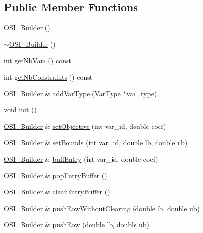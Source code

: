 \subsection*{Public Member Functions}
\begin{DoxyCompactItemize}
\item 
\hyperlink{class_o_s_i___builder_ab1b7372acb9c318a8a3d9c3061b3c71b}{O\+S\+I\+\_\+\+Builder} ()
\item 
\hyperlink{class_o_s_i___builder_a1dd195dbdb3b7fec119563f671c66ebd}{$\sim$\+O\+S\+I\+\_\+\+Builder} ()
\item 
int \hyperlink{class_o_s_i___builder_a23dc928bffaf8828450e6843f63f8fe4}{get\+Nb\+Vars} () const
\item 
int \hyperlink{class_o_s_i___builder_a8e7944db07ca3585577acf16847f5bd4}{get\+Nb\+Constraints} () const
\item 
\hyperlink{class_o_s_i___builder}{O\+S\+I\+\_\+\+Builder} \& \hyperlink{class_o_s_i___builder_a2d3a565b98d8ebf4223929527de84652}{add\+Var\+Type} (\hyperlink{class_o_s_i___builder_1_1_var_type}{Var\+Type} $\ast$var\+\_\+type)
\item 
void \hyperlink{class_o_s_i___builder_a28598ca3fd95a548245070ffecaf8294}{init} ()
\item 
\hyperlink{class_o_s_i___builder}{O\+S\+I\+\_\+\+Builder} \& \hyperlink{class_o_s_i___builder_aaae1174492586d9ffe4b2cfec17823d7}{set\+Objective} (int var\+\_\+id, double coef)
\item 
\hyperlink{class_o_s_i___builder}{O\+S\+I\+\_\+\+Builder} \& \hyperlink{class_o_s_i___builder_a8def1d148b0bb00d9ac4f454a5497e17}{set\+Bounds} (int var\+\_\+id, double lb, double ub)
\item 
\hyperlink{class_o_s_i___builder}{O\+S\+I\+\_\+\+Builder} \& \hyperlink{class_o_s_i___builder_adb96cad71e8d4ab93888969730fe5ad8}{buff\+Entry} (int var\+\_\+id, double coef)
\item 
\hyperlink{class_o_s_i___builder}{O\+S\+I\+\_\+\+Builder} \& \hyperlink{class_o_s_i___builder_a3f6998733dd18dd9bfa94c1db0988e40}{pop\+Entry\+Buffer} ()
\item 
\hyperlink{class_o_s_i___builder}{O\+S\+I\+\_\+\+Builder} \& \hyperlink{class_o_s_i___builder_a0a58121e43e6b2cc4336e4ad23805585}{clear\+Entry\+Buffer} ()
\item 
\hyperlink{class_o_s_i___builder}{O\+S\+I\+\_\+\+Builder} \& \hyperlink{class_o_s_i___builder_a123c8cb445a247c6a8cb3e8271553e77}{push\+Row\+Without\+Clearing} (double lb, double ub)
\item 
\hyperlink{class_o_s_i___builder}{O\+S\+I\+\_\+\+Builder} \& \hyperlink{class_o_s_i___builder_a4aca356d3d67593e7c60f4304979ec7b}{push\+Row} (double lb, double ub)

\end{DoxyCompactItemize}
